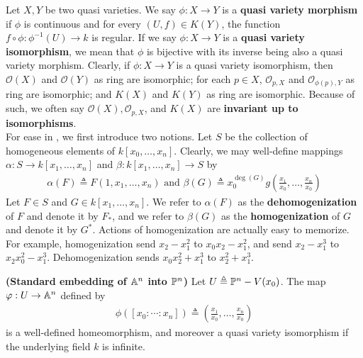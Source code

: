 \documentclass{report}
\begin{document}
Let $X,Y$ be two quasi varieties. We say $\phi : X\rightarrow Y$ is a \textbf{quasi variety morphism} if $\phi$ is continuous and for every $(U,f)\in K(Y)$, the function $f \circ \phi:\phi^{-1}(U)\rightarrow k$ is regular. If we say  $\phi : X\rightarrow Y$ is a \textbf{quasi variety isomorphism}, we mean that $\phi$ is bijective with its inverse being also a quasi variety morphism. Clearly, if $\phi :X\rightarrow Y$ is a quasi variety isomorphism, then $\mathscr{O}(X)$ and $\mathscr{O}(Y)$ as ring are isomorphic; for each $p \in X$, $\mathscr{O}_{p,X}$ and $\mathscr{O}_{\phi (p),Y}$ as ring are isomorphic; and $K(X)$ and $K(Y)$ as ring are isomorphic. Because of such, we often say $\mathscr{O}(X),\mathscr{O}_{p,X}$, and $K(X)$ are \textbf{invariant up to isomorphisms}.\\

For ease in , we first introduce two notions. Let $S$ be the collection of homogeneous elements of $k[x_0,\dots ,x_n]$. Clearly, we may well-define mappings  $\alpha :S \to k[x_1,\dots ,x_n]$ and $\beta :k[x_1,\dots ,x_n]\to S$ by 
\begin{align*}
\alpha (F)\triangleq F(1,x_1,\dots ,x_n)\text{ and }\beta (G)\triangleq x_0^{\operatorname{deg}(G)} g\left(\frac{x_1}{x_0},\dots ,\frac{x_n}{x_0}\right)
\end{align*}
Let $F \in S$ and $G \in k[x_1,\dots ,x_n]$. We refer to $\alpha (F)$ as the \textbf{dehomogenization} of $F$ and denote it by $F_*$, and we refer to $\beta (G)$ as the \textbf{homogenization} of $G$ and denote it by $G^*$. Actions of homogenization are actually easy to memorize. For example, homogenization send $x_2-x_1^2$ to  $x_0x_2-x_1^2$, and send  $x_2-x_1^3$ to  $x_2x_0^2-x_1^3$. Dehomogenization sends $x_0x_2^2+x_1^3$ to  $x_2^2+x_1^3$. 
\begin{theorem}
\label{Ste}
\textbf{(Standard embedding of $\A^n$ into  $\P^n$)} Let  $U\triangleq \P^n - V(x_0)$. The map $\phi: U\rightarrow \A^n$  defined by 
\begin{align*}
\phi \left([x_0:\cdots :x_n]\right)\triangleq \left(\frac{x_1}{x_0},\dots ,\frac{x_n}{x_0}\right)
\end{align*}
is a well-defined homeomorphism, and moreover a quasi variety isomorphism if the underlying field $k$ is infinite.  
\end{theorem}
\end{document}
